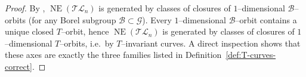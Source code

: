 \documentclass[10pt]{amsart}
\theoremstyle{definition}
\DeclareMathOperator{\NE}{NE}
\newcommand{\TL}{\mathcal{TL}}
\theoremstyle{plain} %
\begin{document}
\begin{proof}
By \cite[Proposition~2.3 and Corollary~2.4]{Br5}, $\NE(\TL_n)$ is generated by classes of closures of $1$--dimensional $\mathscr{B}$--orbits (for any Borel subgroup $\mathscr{B}\subset \mathscr{G}$). Every $1$--dimensional $\mathscr{B}$--orbit contains a unique closed $T$--orbit, hence $\NE(\TL_n)$ is generated by classes of closures of $1$--dimensional $T$--orbits, i.e.\ by $T$--invariant curves. A direct inspection shows that these axes are exactly the three families listed in Definition~\ref{def:T-curves-correct}.
\end{proof}

\end{document}
